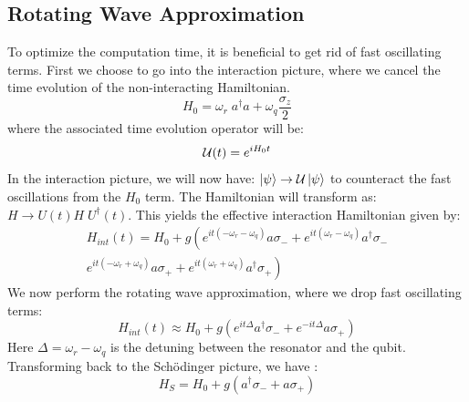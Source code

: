 \subsection{Rotating Wave Approximation}
To optimize the computation time, it is beneficial to get rid of fast oscillating terms. First we choose to go into the interaction picture, where we cancel the time evolution of the non-interacting Hamiltonian.
\begin{equation}
    H_0 = \omega_r \; a^\dagger a + \omega_q\frac{\sigma_z}{2} 
\end{equation}
where the associated time evolution operator will be:
\begin{equation}
    \mathcal{U}(t) = e^{iH_0t}
\end{equation}
In the interaction picture, we will now have: $\ket{\psi} \rightarrow \mathcal{U}\ket{\psi}$ to counteract the fast oscillations from the $H_0$ term. The Hamiltonian will transform as: $H \rightarrow U(t) H \; U^\dagger(t)$. This yields the effective interaction Hamiltonian given by:
\begin{align*}
    H_{int}(t) = H_0 + g \left(e^{it(-\omega_r - \omega_q)} a \sigma_- + e^{it(\omega_r - \omega_q)} a^\dagger \sigma_-\right.  \\ 
    \left.e^{it(-\omega_r + \omega_q)} a \sigma_+ + e^{it(\omega_r + \omega_q)} a^\dagger \sigma_+\right)
\end{align*}
We now perform the rotating wave approximation, where we drop fast oscillating terms:
\begin{equation}
    H_{int}(t) \approx H_0 + g \left(e^{it\Delta}a^\dagger\sigma_- +  e^{-it\Delta}a\sigma_+\right)
\end{equation}
Here $\Delta = \omega_r - \omega_q$ is the detuning between the resonator and the qubit. Transforming back to the Schödinger picture, we have \cite{blais_circuit_2021}:
\begin{equation}
    H_{S} = H_0 + g \left(a^\dagger\sigma_- +  a\sigma_+\right)
\end{equation}

